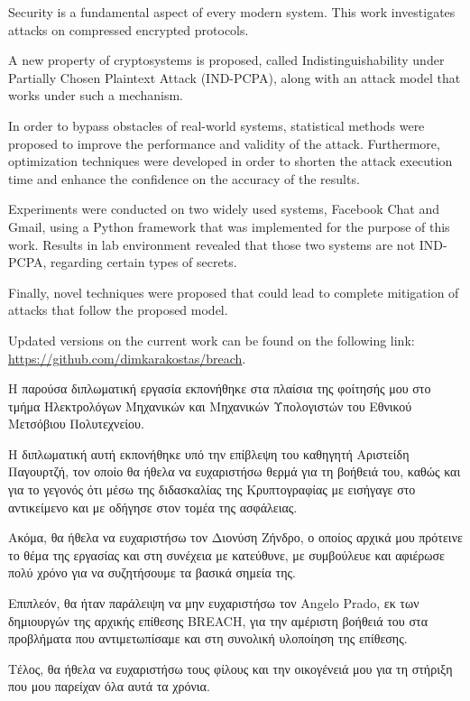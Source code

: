 \begin{abstracten}

Security is a fundamental aspect of every modern system. This work investigates
attacks on compressed encrypted protocols.

A new property of cryptosystems is proposed, called Indistinguishability under
Partially Chosen Plaintext Attack (IND-PCPA), along with an attack model that
works under such a mechanism.

In order to bypass obstacles of real-world systems, statistical methods were
proposed to improve the performance and validity of the attack. Furthermore,
optimization techniques were developed in order to shorten the attack execution
time and enhance the confidence on the accuracy of the results.

Experiments were conducted on two widely used systems, Facebook Chat and Gmail, using
a Python framework that was implemented for the purpose of this work. Results
in lab environment revealed that those two systems are not IND-PCPA, regarding
certain types of secrets.

Finally, novel techniques were proposed that could lead to complete mitigation
of attacks that follow the proposed model.

Updated versions on the current work can be found on the following link:
\url{https://github.com/dimkarakostas/breach}.

\end{abstracten}

\begin{acknowledgementsgr}
Η παρούσα διπλωματική εργασία εκπονήθηκε στα πλαίσια της φοίτησής μου στο τμήμα
Ηλεκτρολόγων Μηχανικών και Μηχανικών Υπολογιστών του Εθνικού Μετσόβιου
Πολυτεχνείου.

Η διπλωματική αυτή εκπονήθηκε υπό την επίβλεψη του καθηγητή Αριστείδη Παγουρτζή,
τον οποίο θα ήθελα να ευχαριστήσω θερμά για τη βοήθειά του, καθώς και για το
γεγονός ότι μέσω της διδασκαλίας της Κρυπτογραφίας με εισήγαγε στο αντικείμενο
και με οδήγησε στον τομέα της ασφάλειας.

Ακόμα, θα ήθελα να ευχαριστήσω τον Διονύση Ζήνδρο, ο οποίος αρχικά μου πρότεινε
το θέμα της εργασίας και στη συνέχεια με κατεύθυνε, με συμβούλευε και αφιέρωσε
πολύ χρόνο για να συζητήσουμε τα βασικά σημεία της.

Επιπλεόν, θα ήταν παράλειψη να μην ευχαριστήσω τον Angelo Prado, εκ των
δημιουργών της αρχικής επίθεσης BREACH, για την αμέριστη βοήθειά του στα
προβλήματα που αντιμετωπίσαμε και στη συνολική υλοποίηση της επίθεσης.

Τέλος, θα ήθελα να ευχαριστήσω τους φίλους και την οικογένειά μου για τη στήριξη
που μου παρείχαν όλα αυτά τα χρόνια.

\end{acknowledgementsgr}
